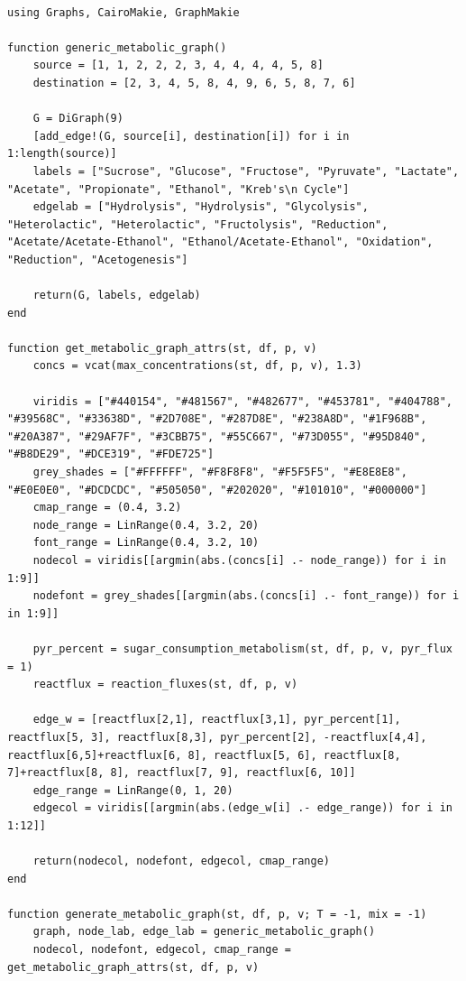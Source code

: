 \documentclass[11pt]{article}
\begin{document}
\begin{verbatim}

using Graphs, CairoMakie, GraphMakie

function generic_metabolic_graph()
    source = [1, 1, 2, 2, 2, 3, 4, 4, 4, 4, 5, 8]
    destination = [2, 3, 4, 5, 8, 4, 9, 6, 5, 8, 7, 6]

    G = DiGraph(9)
    [add_edge!(G, source[i], destination[i]) for i in 1:length(source)]
    labels = ["Sucrose", "Glucose", "Fructose", "Pyruvate", "Lactate", "Acetate", "Propionate", "Ethanol", "Kreb's\n Cycle"]
    edgelab = ["Hydrolysis", "Hydrolysis", "Glycolysis", "Heterolactic", "Heterolactic", "Fructolysis", "Reduction", "Acetate/Acetate-Ethanol", "Ethanol/Acetate-Ethanol", "Oxidation", "Reduction", "Acetogenesis"]

    return(G, labels, edgelab)
end

function get_metabolic_graph_attrs(st, df, p, v)
    concs = vcat(max_concentrations(st, df, p, v), 1.3)

    viridis = ["#440154", "#481567", "#482677", "#453781", "#404788", "#39568C", "#33638D", "#2D708E", "#287D8E", "#238A8D", "#1F968B", "#20A387", "#29AF7F", "#3CBB75", "#55C667", "#73D055", "#95D840", "#B8DE29", "#DCE319", "#FDE725"]
    grey_shades = ["#FFFFFF", "#F8F8F8", "#F5F5F5", "#E8E8E8", "#E0E0E0", "#DCDCDC", "#505050", "#202020", "#101010", "#000000"]
    cmap_range = (0.4, 3.2)
    node_range = LinRange(0.4, 3.2, 20)
    font_range = LinRange(0.4, 3.2, 10)
    nodecol = viridis[[argmin(abs.(concs[i] .- node_range)) for i in 1:9]]
    nodefont = grey_shades[[argmin(abs.(concs[i] .- font_range)) for i in 1:9]]

    pyr_percent = sugar_consumption_metabolism(st, df, p, v, pyr_flux = 1)
    reactflux = reaction_fluxes(st, df, p, v)

    edge_w = [reactflux[2,1], reactflux[3,1], pyr_percent[1], reactflux[5, 3], reactflux[8,3], pyr_percent[2], -reactflux[4,4], reactflux[6,5]+reactflux[6, 8], reactflux[5, 6], reactflux[8, 7]+reactflux[8, 8], reactflux[7, 9], reactflux[6, 10]]
    edge_range = LinRange(0, 1, 20)
    edgecol = viridis[[argmin(abs.(edge_w[i] .- edge_range)) for i in 1:12]]

    return(nodecol, nodefont, edgecol, cmap_range)
end

function generate_metabolic_graph(st, df, p, v; T = -1, mix = -1)
    graph, node_lab, edge_lab = generic_metabolic_graph()
    nodecol, nodefont, edgecol, cmap_range = get_metabolic_graph_attrs(st, df, p, v)


\end{verbatim}
\end{document}
